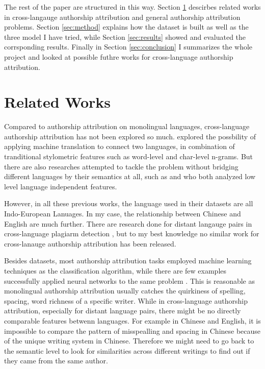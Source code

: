 \documentclass[11pt,a4paper]{article}
\begin{document}
The rest of the paper are structured in this way. Section \ref{sec:related-work} descirbes related works in cross-langauge authorship attribution and general authorship attribution problems. Section \ref{sec:method} explains how the dataset is built as well as the three model I have tried, while Section \ref{sec:results} showed and evaluated the corrsponding results. Finally in Section \ref{sec:conclusion} I summarizes the whole project and looked at possible futhre works for cross-language authorship attribution.

\section{Related Works}\label{sec:related-work}

Compared to authorship attribution on monolingual languages, cross-language authorship attribution has not been explored so much. \citet{bogdanova2014cross} explored the possbility of applying machine translation to connect two languages, in combination of tranditional stylometric features such as word-level and char-level n-grams. But there are also researches attempted to tackle the problem without bridging different languages by their semantics at all, such as \citet{llorens2016deep} and \citet{sarwar2018scalable} who both analyzed low level language independent features.

However, in all these previous works, the language used in their datasets are all Indo-European Lanuages. In my case, the relationship between Chinese and English are much further. There are research done for distant langauge pairs in cross-language plagiarm detection \cite{barron2010plagiarism}, but to my best knowledge no similar work for cross-lanauge authorship attribution has been released.

Besides datasets, most authorship attribution tasks employed machine learning techniques as the classification algorithm, while there are few examples successfully applied neural networks to the same problem \cite{shrestha2017convolutional}. This is reasonable as monolingual authorship attribution usually catches the quirkiness of spelling, spacing, word richness of a specific writer. While in cross-language authorship attribution, especially for distant language pairs, there might be no directly comparable features betwenn languages. For example in Chinese and English, it is impossible to compare the pattern of misspealling and spacing in Chinese because of the unique writing system in Chinese. Therefore we might need to go back to the semantic level to look for similarities across different writings to find out if they came from the same author.
\end{document}
